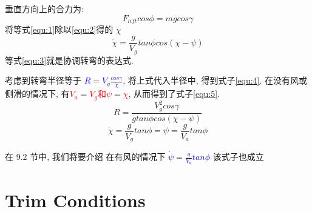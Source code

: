 \documentclass[UTF8,a4paper,10pt,nocolorlinks]{ctexart}
\begin{document}
    垂直方向上的合力为:
    \begin{equation}
        F_{lift} cos \phi = mg cos\gamma
        \label{equ:2}
    \end{equation}
    将等式\ref{equ:1}除以\ref{equ:2}得的 $\dot{\chi}$
    \begin{equation}
        \dot{\chi} = \frac{g}{V_{g}} tan \phi cos(\chi - \psi)
        \label{equ:3}
    \end{equation}
    等式\ref{equ:3}就是协调转弯的表达式. 
    \par 考虑到转弯半径等于 \textcolor{blue}{ $R = V_{g} \frac{cos \gamma}{\dot{\chi}}$}, 将上式代入半径中, 得到式子\ref{equ:4}. 在没有风或侧滑的情况下, 有\textcolor{red}{$V_{a} = V_{g}$和$\psi = \chi$}, 从而得到了式子\ref{equ:5}. 
    \begin{equation}
        R = \frac{V_{g}^{2} cos \gamma}{g tan \phi cos(\chi - \psi)} 
        \label{equ:4}
    \end{equation}
    \begin{equation}
        \dot{\chi} = \frac{g}{V_{g}} tan \phi = \dot{\psi} = \frac{g}{V_{a}} tan \phi
        \label{equ:5}
    \end{equation}
    \par 在 9.2 节中, 我们将要介绍 在有风的情况下 \textcolor{blue}{$ \dot{\psi} = \frac{g}{V_{a}} tan \phi$} 该式子也成立
    
    \section{Trim Conditions}
\end{document}
